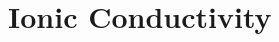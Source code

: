 \documentclass{article}
\begin{document}



  
  \section{Ionic Conductivity}\label{section:ionic_conductivity}
  
\end{document}
